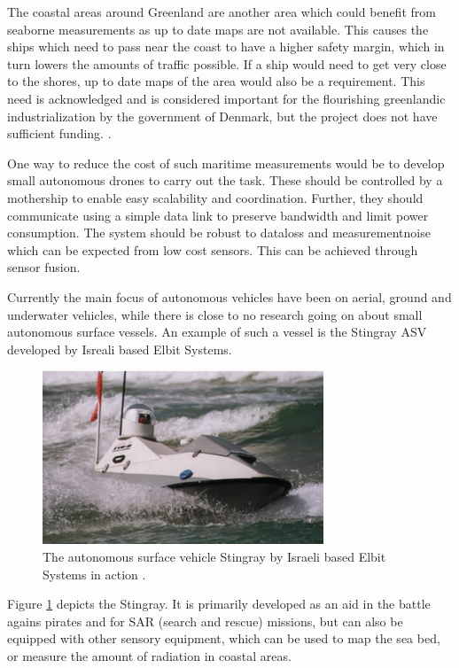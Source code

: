 \documentclass{ifacconf}
\begin{document}
The coastal areas around Greenland are another area which could benefit from seaborne measurements as up to date maps are not available. This causes the ships which need to pass near the coast to have a higher safety margin, which in turn lowers the amounts of traffic possible. If a ship would need to get very close to the shores, up to date maps of the area would also be a requirement. This need is acknowledged and is considered important for the flourishing greenlandic industrialization by the government of Denmark, but the project does not have sufficient funding. \cite{engineer}.

One way to reduce the cost of such maritime measurements would be to develop small autonomous drones to carry out the task. These should be controlled by a mothership to enable easy scalability and coordination. Further, they should communicate using a simple data link to preserve bandwidth and limit power consumption. The system should be robust to dataloss and measurementnoise which can be expected from low cost sensors. This can be achieved through sensor fusion.

Currently the main focus of autonomous vehicles have been on aerial, ground and underwater vehicles, while there is close to no research going on about small autonomous surface vessels. An example of such a vessel is the Stingray ASV developed by Isreali based Elbit Systems. 
\begin{figure}
	\begin{center}
		\includegraphics[width=8.4cm]{img/stingray.jpg} %
		\caption{The autonomous surface vehicle Stingray by Israeli based Elbit Systems in action \cite{defense}.}  
		\label{fig:stingray}
	\end{center}
\end{figure}

Figure \ref{fig:stingray} depicts the Stingray. It is primarily developed as an aid in the battle agains pirates and for SAR (search and rescue) missions, but can also be equipped with other sensory equipment, which can be used to map the sea bed, or measure the amount of radiation in coastal areas. 
\end{document}
